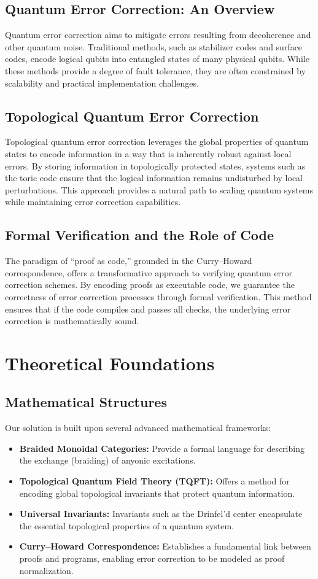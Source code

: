 \documentclass[12pt]{article}
\begin{document}
\subsection{Quantum Error Correction: An Overview}
Quantum error correction aims to mitigate errors resulting from decoherence and other quantum noise. Traditional methods, such as stabilizer codes and surface codes, encode logical qubits into entangled states of many physical qubits. While these methods provide a degree of fault tolerance, they are often constrained by scalability and practical implementation challenges.

\subsection{Topological Quantum Error Correction}
Topological quantum error correction leverages the global properties of quantum states to encode information in a way that is inherently robust against local errors. By storing information in topologically protected states, systems such as the toric code ensure that the logical information remains undisturbed by local perturbations. This approach provides a natural path to scaling quantum systems while maintaining error correction capabilities.

\subsection{Formal Verification and the Role of Code}
The paradigm of ``proof as code,'' grounded in the Curry–Howard correspondence, offers a transformative approach to verifying quantum error correction schemes. By encoding proofs as executable code, we guarantee the correctness of error correction processes through formal verification. This method ensures that if the code compiles and passes all checks, the underlying error correction is mathematically sound.

\section{Theoretical Foundations}
\subsection{Mathematical Structures}
Our solution is built upon several advanced mathematical frameworks:
\begin{itemize}[label=\textbullet]
    \item \textbf{Braided Monoidal Categories:} Provide a formal language for describing the exchange (braiding) of anyonic excitations.
    \item \textbf{Topological Quantum Field Theory (TQFT):} Offers a method for encoding global topological invariants that protect quantum information.
    \item \textbf{Universal Invariants:} Invariants such as the Drinfel’d center encapsulate the essential topological properties of a quantum system.
    \item \textbf{Curry--Howard Correspondence:} Establishes a fundamental link between proofs and programs, enabling error correction to be modeled as proof normalization.
\end{itemize}
\end{document}
